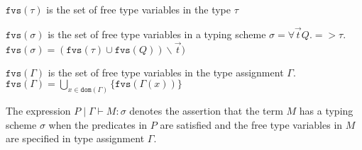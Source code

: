 \begin{defn}

  $\texttt{fvs}(\tau)$ is the set of free type variables in the type $\tau$

  \noindent$\texttt{fvs}(\sigma)$ is the set of free type variables in a typing scheme $\sigma = \forall \vec{t} Q. => \tau$.\\
  $\texttt{fvs}(\sigma) = (\texttt{fvs}(\tau) \cup \texttt{fvs}(Q)) \backslash \vec{t})$

  \noindent$\texttt{fvs}(\Gamma)$ is the set of free type variables in the type assignment $\Gamma$.\\
  $\texttt{fvs}(\Gamma) = \bigcup_{x \in \texttt{dom}(\Gamma)} \{ \texttt{fvs}(\Gamma(x)) \}$
\end{defn}

\begin{defn}
The expression $P \mid \Gamma \vdash M : \sigma$ denotes the assertion that the term $M$ has a typing scheme $\sigma$
when the predicates in $P$ are satisfied and the free type variables in $M$ are specified in type assignment $\Gamma$.
\end{defn}



